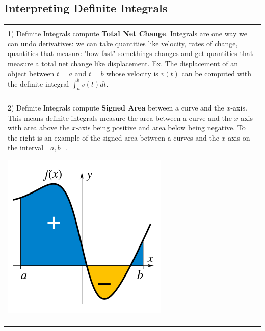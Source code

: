 \documentclass[12pt]{report}
\newenvironment{boxe}
    {\begin{center}
    \begin{tabular}{|p{0.9\textwidth}|}
    \hline\\
    }
    { 
    \\\\\hline
    \end{tabular} 
    \end{center}
    }
\begin{document}
\subsection*{Interpreting Definite Integrals}
\begin{boxe}
    1) Definite Integrals compute \textbf{Total Net Change}. Integrals are one way we can undo derivatives: we can take quantities like velocity, rates of change, quantities that measure "how fast" somethings changes and get quantities that measure a total net change like displacement.
    Ex. The displacement of an object between $t=a$ and $t=b$ whose velocity is $v(t)$ can be computed with the definite integral $\displaystyle{\int_{a}^bv(t) dt}$.\\\\    

    \begin{minipage}{0.65\textwidth}
    2) Definite Integrals compute \textbf{Signed Area} between a curve and the $x$-axis. This means definite integrals measure the area between a curve and the $x$-axis with area above the $x$-axis being positive and area below being negative. To the right is an example of the signed area between a curves and the $x$-axis on the interval $[a,b]$. 
    \end{minipage}
    \hfill
    \begin{minipage}{0.2\textwidth}
    \includegraphics[scale=.3]{300px-Integral_example.svg.png}
    \end{minipage}
\end{boxe}
\end{document}
